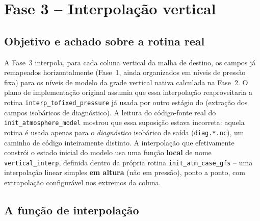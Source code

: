 \chapter{Fase 3 -- Interpolação vertical}
\label{cap:fase3}

\section{Objetivo e achado sobre a rotina real}

A Fase~3 interpola, para cada coluna vertical da malha de destino, os
campos já remapeados horizontalmente (Fase~1, ainda organizados em
níveis de pressão fixa) para os níveis de modelo da grade vertical
nativa calculada na Fase~2. O plano de implementação original assumia
que essa interpolação reaproveitaria a rotina \texttt{interp\_tofixed\_pressure}
já usada por outro estágio do \selfgrib{} (extração dos campos
isobáricos de diagnóstico). A leitura do código-fonte real do
\texttt{init\_atmosphere\_model} mostrou que essa suposição estava
incorreta: aquela rotina é usada apenas para o \emph{diagnóstico}
isobárico de saída (\texttt{diag.*.nc}), um caminho de código
inteiramente distinto. A interpolação que efetivamente constrói o
estado inicial do modelo usa uma função \textbf{local} de nome
\texttt{vertical\_interp}, definida dentro da própria rotina
\texttt{init\_atm\_case\_gfs} -- uma interpolação linear simples
\textbf{em altura} (não em pressão), ponto a ponto, com extrapolação
configurável nos extremos da coluna.

\section{A função de interpolação}


